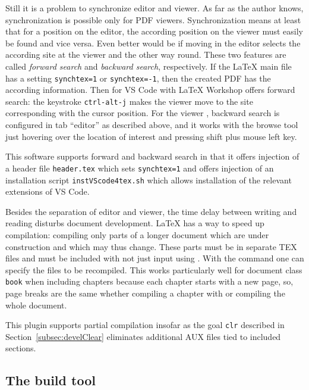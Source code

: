 Still it is a problem to synchronize editor and viewer. 
As far as the author knows, synchronization is possible only for PDF viewers. 
Synchronization means at least that for a position on the editor, 
the according position on the viewer must easily be found 
and vice versa. 
Even better would be if moving in the editor selects the according site at the viewer 
and the other way round. 
These two features are called \emph{forward search} and \emph{backward search}, respectively. 
If the \LaTeX{} main file has a setting \texttt{synchtex=1} or \texttt{synchtex=-1}, 
then the created PDF has the according information. 
Then for VS Code with \LaTeX{} Workshop offers forward search: 
the keystroke \texttt{ctrl-alt-j} 
makes the viewer move to the site corresponding with the cursor position. 
For the viewer , backward search is configured in tab ``editor'' 
as described above, 
and it works with the browse tool just hovering over the location of interest 
and pressing shift plus mouse left key. 

This software supports forward and backward search 
in that it offers injection of a header file \texttt{header.tex} 
which sets \texttt{synchtex=1} 
and offers injection of an installation script \texttt{instVScode4tex.sh} 
which allows installation of the relevant extensions of VS Code. 
\medskip


Besides the separation of editor and viewer, 
the time delay between writing and reading 
disturbs document development. 
\LaTeX{} has a way to speed up compilation: 
compiling only parts of a longer document 
which are under construction and which may thus change. 
These parts must be in separate TEX files 
and must be included with  
not just input using . 
With the command  
one can specify the files to be recompiled. 
This works particularly well for document class \texttt{book} 
when including chapters because each chapter starts with a new page, 
so, page breaks are the same whether 
compiling a chapter with  
or compiling the whole document. 

This plugin supports partial compilation 
insofar as the goal \texttt{clr} described in Section~\ref{subsec:develClear} 
eliminates additional AUX files tied to included sections. 


\subsection{The build tool }\label{subsec:develLatexmk}

